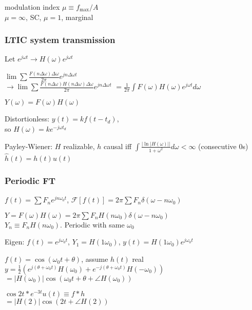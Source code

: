 \documentclass[4pt]{article}
\theoremstyle{definition}
\theoremstyle{definition}
\renewcommand{\o}{\omega}
\begin{document}
\begin{multicols}{3}
    modulation index \(\mu\equiv f_{\text{max}}/A\)\\
    $\mu = \infty$, SC, $\mu = 1$, marginal
\subsubsection{LTIC system transmission}
    Let \(e^{j\o t} \rightarrow H(\o) e^{j\o t}\)

    \(\lim\sum \frac{F(n\Delta\o)\Delta\o}{2\pi} e^{jn\Delta\o t}\)\\
    \(\rightarrow \lim\sum \frac{F(n\Delta\o)H(n\Delta\o)\Delta\o}{2\pi} e^{jn\Delta\o t}\)
    \(= \frac{1}{2\pi}\int F(\o)H(\o)e^{j\o t} d\o\)

    \(Y(\o) = F(\o) H(\o)\)

    Distortionless: $y(t) = kf(t-t_d)$,\\
    so $H(\o) = ke^{-j\o t_d}$          %

    Payley-Wiener: $H$ realizable, $h$ causal iff \(\int\frac{|\ln|H(\omega)||}{1+\o^2} d\o < \infty\) (consecutive 0s)\\
    \(\hat{h}(t) = h(t) u(t)\)

\subsubsection{Periodic FT}
    \(f(t) = \sum F_n e^{jn\o_0 t}\), \(\mathcal{F}[f(t)] = 2\pi \sum F_n \delta(\omega - n\o_0)\)      %

    \(Y = F(\omega)H(\omega) = 2\pi \sum F_n H(n\omega_0) \delta(\omega - n\omega_0) \) \\            %
    $Y_n \equiv F_n H(n\o_0)$. Periodic with same $\omega_0$

    Eigen: $f(t) = e^{j\o_0t}$, \(Y_1 = H(1\o_0)\), $y(t) = H(1\o_0) e^{j\o_0 t}$

    $f(t) = \cos(\o_0 t + \theta)$, assume $h(t)$ real\\
    \(y = \frac 1 2 (e^{j(\theta + \o_0 t)}H(\o_0) + e^{-j(\theta + \o_0 t)}H(-\o_0))\)\\          %
    \(=|H(\o_0)| \cos(\o_0t + \theta + \angle H(\o_0))\)

    \(\cos 2t * e^{-3t} u(t) \equiv f * h\)\\       %
    \(=|H(2)| \cos(2t + \angle H(2))\)              %

\end{multicols}
\end{document}
